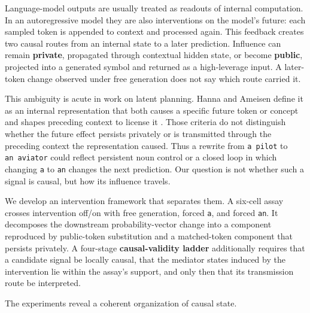 \documentclass[
]{article}
\begin{document}
Language-model outputs are usually treated as readouts of internal
computation. In an autoregressive model they are also interventions on
the model's future: each sampled token is appended to context and
processed again. This feedback creates two causal routes from an
internal state to a later prediction. Influence can remain
\textbf{private}, propagated through contextual hidden state, or become
\textbf{public}, projected into a generated symbol and returned as a
high-leverage input. A later-token change observed under free generation
does not say which route carried it.

This ambiguity is acute in work on latent planning. Hanna and Ameisen
define it as an internal representation that both causes a specific
future token or concept and shapes preceding context to license it
\citep{hanna2026latent}. Those criteria do not distinguish whether the
future effect persists privately or is transmitted through the preceding
context the representation caused. Thus a rewrite from \texttt{a\ pilot}
to \texttt{an\ aviator} could reflect persistent noun control or a
closed loop in which changing \texttt{a} to \texttt{an} changes the next
prediction. Our question is not whether such a signal is causal, but how
its influence travels.

We develop an intervention framework that separates them. A six-cell
assay crosses intervention off/on with free generation, forced
\texttt{a}, and forced \texttt{an}. It decomposes the downstream
probability-vector change into a component reproduced by public-token
substitution and a matched-token component that persists privately. A
four-stage \textbf{causal-validity ladder} additionally requires that a
candidate signal be locally causal, that the mediator states induced by
the intervention lie within the assay's support, and only then that its
transmission route be interpreted.

The experiments reveal a coherent organization of causal state.
\end{document}

